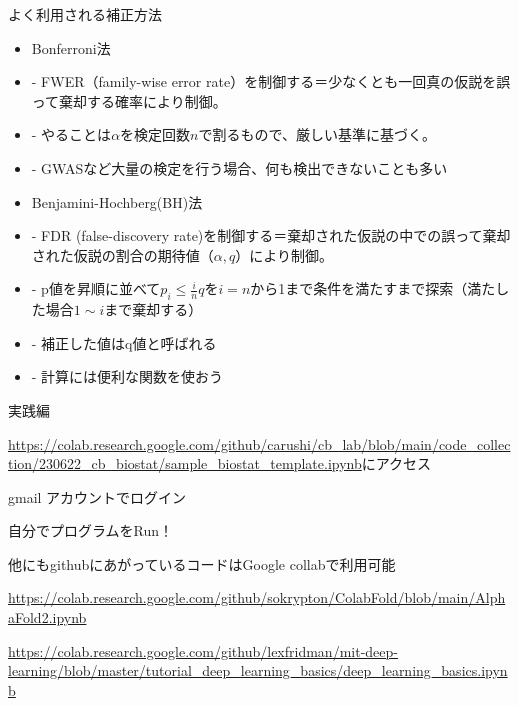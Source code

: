 \documentclass[cjk, aspectratio=169]{beamer}
\begin{document}
    \begin{frame}{よく利用される補正方法}
    \begin{itemize}
        \item Bonferroni法
        \item - FWER（family-wise error rate）を制御する＝少なくとも一回真の仮説を誤って棄却する確率により制御。
        \item - やることは$\alpha$を検定回数$n$で割るもので、厳しい基準に基づく。
        \item - GWASなど大量の検定を行う場合、何も検出できないことも多い
        \item Benjamini-Hochberg(BH)法
        \item - FDR (false-discovery rate)を制御する＝棄却された仮説の中での誤って棄却された仮説の割合の期待値（$\alpha,q$）により制御。
        \item - p値を昇順に並べて$p_i \le \frac{i}{n}q$を$i=n$から1まで条件を満たすまで探索（満たした場合$1 \sim i$まで棄却する）
        \item - 補正した値はq値と呼ばれる
        \item - 計算には便利な関数を使おう
    \end{itemize}
    \end{frame}

\begin{frame}{実践編}
\item \url{https://colab.research.google.com/github/carushi/cb_lab/blob/main/code_collection/230622_cb_biostat/sample_biostat_template.ipynb}にアクセス
\item gmail アカウントでログイン
\item 自分でプログラムをRun！
\item 他にもgithubにあがっているコードはGoogle collabで利用可能
\item \url{https://colab.research.google.com/github/sokrypton/ColabFold/blob/main/AlphaFold2.ipynb}
\item \url{https://colab.research.google.com/github/lexfridman/mit-deep-learning/blob/master/tutorial_deep_learning_basics/deep_learning_basics.ipynb}
\end{frame}
\end{document}
